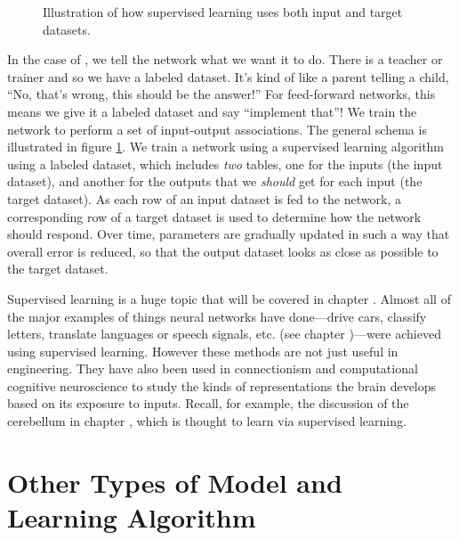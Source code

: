 \begin{figure}[h]
\centering
{}
\caption[Simbrain screenshot with graphical elements added by Pamela Payne.]{Illustration of how supervised learning uses both input and target datasets.}
\label{supervised_learning}
\end{figure}

In the case of , we tell the network what we want it to do. There is a teacher or trainer and so we have a labeled dataset. It's kind of like a parent telling a child, ``No, that's wrong, this should be the answer!'' For feed-forward networks, this means we give it a labeled dataset and say ``implement that''! We train the network to perform a set of input-output associations. The general schema is illustrated in figure \ref{supervised_learning}. We train a network using a supervised learning algorithm using a labeled dataset, which includes \emph{two} tables, one for the inputs (the input dataset), and another for the outputs that we \emph{should} get for each input (the target dataset). As each row of an input dataset is  fed to the network, a corresponding row of a target dataset is used to determine how the network should respond. Over time, parameters are gradually updated in such a way that overall error is reduced, so that the output dataset looks as close as possible to the target dataset.

Supervised learning is a huge topic that will be covered in chapter . Almost all of the major examples of things neural networks have done---drive cars, classify letters, translate languages or speech signals, etc. (see chapter )---were achieved using supervised learning. However these methods are not just useful in engineering. They have also been used in connectionism and computational cognitive neuroscience to study the kinds  of representations the brain develops based on its exposure to inputs. Recall, for example, the discussion of the cerebellum in chapter , which is thought to learn via supervised learning.

\section{Other Types of Model and Learning Algorithm}

